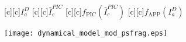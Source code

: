 \documentclass{article}
\begin{document}
\begin{figure}[htb]
  \begin{center}


        [c][c]{$I_a^D$}
        [c][c]{$\bar{I}_e^{PIC}$}
        [c][c]{$f_{\mathrm{PIC}}(\bar{I}_e^{PIC})$}
        [c][c]{\hspace{0.5mm}$f_{\mathrm{APP}}(I_a^D)$}

    \texttt{[image: dynamical\_model\_mod\_psfrag.eps]}
    \end{center}
\end{figure}
\end{document}
